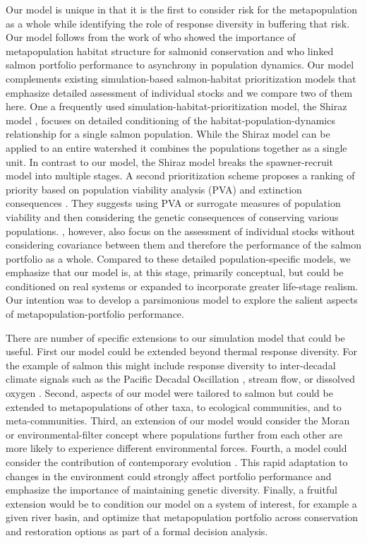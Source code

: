 Our model is unique in that it is the first to consider risk for the metapopulation as a whole while identifying the role of response diversity in buffering that risk. Our model follows from the work of \citet{cooper1999} who showed the importance of metapopulation habitat structure for salmonid conservation and \citet{moore2010} who linked salmon portfolio performance to asynchrony in population dynamics. Our model complements existing simulation-based salmon-habitat prioritization models that emphasize detailed assessment of individual stocks and we compare two of them here. One a frequently used simulation-habitat-prioritization model, the Shiraz model \citep{scheuerell2006}, focuses on detailed conditioning of the habitat-population-dynamics relationship for a single salmon population. While the Shiraz model can be applied to an entire watershed it combines the populations together as a single unit. In contrast to our model, the Shiraz model breaks the spawner-recruit model into multiple stages. A second prioritization scheme proposes a ranking of priority based on population viability analysis (PVA) and extinction consequences \citep{allendorf1997}. They suggests using PVA or surrogate measures of population viability and then considering the genetic consequences of conserving various populations. \citet{allendorf1997}, however, also focus on the assessment of individual stocks without considering covariance between them and therefore the performance of the salmon portfolio as a whole. Compared to these detailed population-specific models, we emphasize that our model is, at this stage, primarily conceptual, but could be conditioned on real systems or expanded to incorporate greater life-stage realism. Our intention was to develop a parsimonious model to explore the salient aspects of metapopulation-portfolio performance.

There are number of specific extensions to our simulation model that could be useful. First our model could be extended beyond thermal response diversity. For the example of salmon this might include response diversity to inter-decadal climate signals such as the Pacific Decadal Oscillation \citep{mantua2002}, stream flow, or dissolved oxygen \citep{priede1988}. Second, aspects of our model were tailored to salmon but could be extended to metapopulations of other taxa, to ecological communities, and to meta-communities. Third, an extension of our model would consider the Moran or environmental-filter concept \citep{schindler2008} where populations further from each other are more likely to experience different environmental forces. Fourth, a model could consider the contribution of contemporary evolution \citep{stockwell2003}. This rapid adaptation to changes in the environment could strongly affect portfolio performance and emphasize the importance of maintaining genetic diversity. Finally, a fruitful extension would be to condition our model on a system of interest, for example a given river basin, and optimize that metapopulation portfolio across conservation and restoration options as part of a formal decision analysis.

